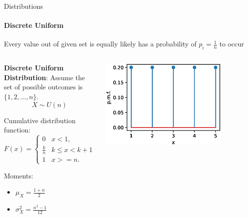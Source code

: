 {    \begin{frame}{Distributions}
        \framesubtitle{Discrete Uniform}
        Every value out of given set is equally likely has a probability of $p_i = \frac{1}{n}$ to occur

        \vspace*{3mm}
        \begin{columns}[onlytextwidth]
            \begin{column}{0.5\textwidth}
                \begin{boxed}
                    \textbf{Discrete Uniform Distribution}:
                    Assume the set of possible outcomes is $\{1, 2, \ldots, n\}$.
                    $$X \sim U(n)$$

                    Cumulative distribution function:
                    $$F(x) = \begin{cases} 0 & x < 1, \\ \frac{k}{n} & k \le x < k+1 \text{ with } 1 \le k < n, \\ 1 & x >= n . \end{cases}$$

                    Moments:
                    \begin{itemize}
                        \item $\mu_X = \frac{1+n}{2}$
                        \item $\sigma_X^2 = \frac{n^2-1}{12}$
                    \end{itemize}
                \end{boxed}
            \end{column}
            \begin{column}{0.5\textwidth}
                \begin{center}
                    \includegraphics[width=0.8\textwidth]{fig/prob_dist_uniform.eps}
                \end{center}
            \end{column}
        \end{columns}
    \end{frame}

}
